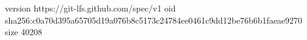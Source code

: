 version https://git-lfs.github.com/spec/v1
oid sha256:c0a70d395a65705d19a076b8c5173c24784ee0461c9dd12be76b6b1faeae9270
size 40208
